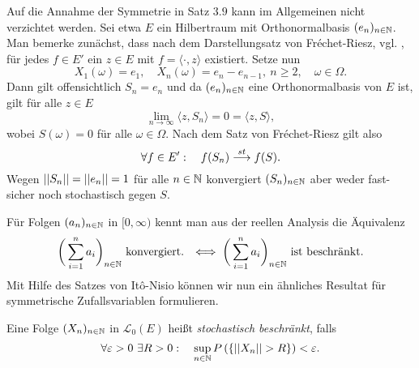\begin{remark}
    Auf die Annahme der Symmetrie in Satz $3.9$ kann im Allgemeinen nicht verzichtet werden. Sei etwa $E$ ein Hilbertraum mit Orthonormalbasis $(e_n)_{n \in \mathbb{N}}$.
    Man bemerke zunächst, dass nach dem Darstellungsatz von Fréchet-Riesz, vgl. \cite[Theorem V.3.6]{werner}, für jedes $f \in E'$ ein $z \in E$ mit $f = \langle \cdot, z \rangle$ existiert. 
    Setze nun 
    $$
        X_1(\omega) = e_1, \quad X_n(\omega) = e_n - e_{n-1}, \ n \geq 2, \quad \omega \in \Omega. 
    $$
    Dann gilt offensichtlich $S_n = e_n$ und da $(e_n)_{n \in \mathbb{N}}$ eine Orthonormalbasis von $E$ ist, gilt für alle $z \in E$
    $$
        \lim_{n \to \infty}\langle z,S_n \rangle = 0 = \langle z,S \rangle,
    $$
    wobei $S(\omega) = 0$ für alle $\omega \in \Omega$. Nach dem Satz von Fréchet-Riesz gilt also 
    $$
        \forall f \in E': \quad f(S_n) \overset{st}{\longrightarrow} f(S). 
    $$
    Wegen $\lvert\lvert S_n \rvert\rvert = \lvert\lvert e_n \rvert\rvert =1$ für alle $n \in \mathbb{N}$ konvergiert $(S_n)_{n \in \mathbb{N}}$ aber weder fast-sicher noch stochastisch gegen $S$. 
    \qexampled 
\end{remark}

Für Folgen $(a_n)_{n \in \mathbb{N}}$ in $[0, \infty)$ kennt man aus der reellen Analysis die Äquivalenz
$$
    \bigg(\sum_{i=1}^n a_i\bigg)_{n \in \mathbb{N}} \text{ konvergiert. } \iff \bigg(\sum_{i=1}^n a_i\bigg)_{n \in \mathbb{N}} \text{ ist beschränkt.}
$$
Mit Hilfe des Satzes von Itô-Nisio können wir nun ein ähnliches Resultat für symmetrische Zufallsvariablen formulieren. 

\begin{mydef}
    Eine Folge $(X_n)_{n \in \mathbb{N}}$ in $\mathcal{L}_0(E)$ heißt \textit{stochastisch beschränkt}, falls
    $$
        \forall \varepsilon >0 \ \exists R > 0: \quad \sup_{n \in \mathbb{N}}P\left(\left\{ \lvert\lvert X_n \rvert\rvert > R \right\}\right) < \varepsilon. 
    $$
\end{mydef}

